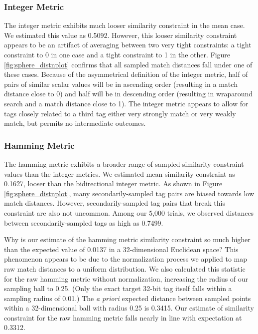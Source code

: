 \subsubsection{Integer Metric}

The integer metric exhibits much looser similarity constraint in the mean case.
We estimated this value as 0.5092.
However, this looser similarity constraint appears to be an artifact of averaging between two very tight constraints: a tight constraint to 0 in one case and a tight constraint to 1 in the other.
Figure \ref{fig:sphere_distnplot} confirms that all sampled match distances fall under one of these cases.
Because of the asymmetrical definition of the integer metric, half of pairs of similar scalar values will be in ascending order (resulting in a match distance close to 0) and half will be in descending order (resulting in wraparound search and a match distance close to 1).
The integer metric appears to allow for tags closely related to a third tag either very strongly match or very weakly match, but permits no intermediate outcomes.

\subsubsection{Hamming Metric}

The hamming metric exhibits a broader range of sampled similarity constraint values than the integer metrics.
We estimated mean similarity constraint as 0.1627, looser than the bidirectional integer metric.
As shown in Figure \ref{fig:sphere_distnplot}, many secondarily-sampled tag pairs are biased towards low match distances.
However, secondarily-sampled tag pairs that break this constraint are also not uncommon.
Among our 5,000 trials, we observed distances between secondarily-sampled tags as high as 0.7499.

Why is our estimate of the hamming metric similarity constraint so much higher than the expected value of 0.0137 in a 32-dimensional Euclidean space?
This phenomenon appears to be due to the normalization process we applied to map raw match distances to a uniform distribution.
We also calculated this statistic for the raw hamming metric without normalization, increasing the radius of our sampling ball to 0.25.
(Only the exact target 32-bit tag itself falls within a sampling radius of 0.01.)
The \textit{a priori} expected distance between sampled points within a 32-dimensional ball with radius 0.25 is 0.3415.
Our estimate of similarity constraint for the raw hamming metric falls nearly in line with expectation at 0.3312.

